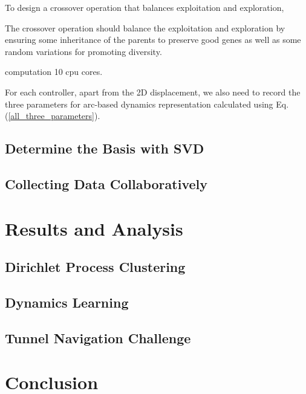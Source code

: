 \documentclass[journal]{IEEEtran}
\begin{document}
To design a crossover operation that balances exploitation and exploration, 


The crossover operation should balance the exploitation and exploration by ensuring some inheritance of the parents to preserve good genes as well as some random variations for promoting diversity.

computation 10 cpu cores.

For each controller, apart from the 2D displacement, we also need to record the three parameters for arc-based dynamics representation calculated using Eq. (\ref{all_three_parameters}).










\subsection{Determine the Basis with SVD}

\subsection{Collecting Data Collaboratively}





\section{Results and Analysis}

\subsection{Dirichlet Process Clustering}


\subsection{Dynamics Learning}

\subsection{Tunnel Navigation Challenge}


\section{Conclusion}








\end{document}
